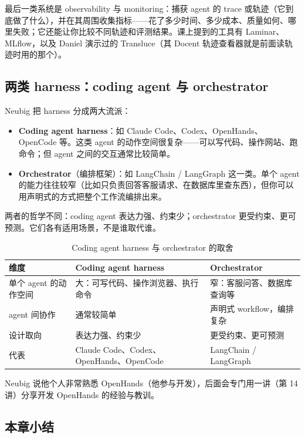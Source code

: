 \documentclass[a4paper]{article}
\begin{document}
最后一类系统是 observability 与 monitoring：捕获 agent 的 trace 或轨迹（它到底做了什么），并在其周围收集指标——花了多少时间、多少成本、质量如何、哪里失败；它还能让你比较不同轨迹和评测结果。课上提到的工具有 Laminar、MLflow，以及 Daniel 演示过的 Transluce（其 Docent 轨迹查看器就是前面读轨迹时用的那个）。

\subsection{两类 harness：coding agent 与 orchestrator}

Neubig 把 harness 分成两大流派：

\begin{itemize}
\item \textbf{Coding agent harness}：如 Claude Code、Codex、OpenHands、OpenCode 等。这类 agent 的动作空间很复杂——可以写代码、操作网站、跑命令；但 agent 之间的交互通常比较简单。
\item \textbf{Orchestrator}（编排框架）：如 LangChain / LangGraph 这一类。单个 agent 的能力往往较窄（比如只负责回答客服请求、在数据库里查东西），但你可以用声明式的方式把整个工作流编排出来。
\end{itemize}

两者的哲学不同：coding agent 表达力强、约束少；orchestrator 更受约束、更可预测。它们各有适用场景，不是谁取代谁。

\begin{table}[H]
\centering
\small
\caption{Coding agent harness 与 orchestrator 的取舍}
\begin{tabular}{p{}p{}p{}}
\toprule
维度 & Coding agent harness & Orchestrator \\
\midrule
单个 agent 的动作空间 & 大：可写代码、操作浏览器、执行命令 & 窄：客服问答、数据库查询等 \\
agent 间协作 & 通常较简单 & 声明式 workflow，编排复杂 \\
设计取向 & 表达力强、约束少 & 更受约束、更可预测 \\
代表 & Claude Code、Codex、OpenHands、OpenCode & LangChain / LangGraph \\
\bottomrule
\end{tabular}
\end{table}

Neubig 说他个人非常熟悉 OpenHands（他参与开发），后面会专门用一讲（第 14 讲）分享开发 OpenHands 的经验与教训。

\subsection{本章小结}
\end{document}
